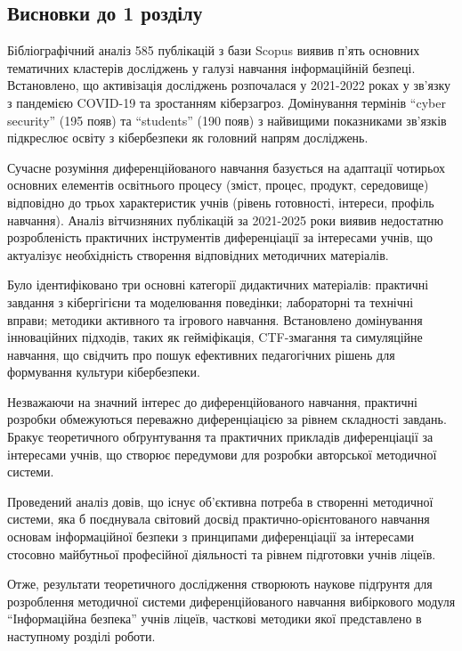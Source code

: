 \subsection*{Висновки до 1 розділу}


Бібліографічний аналіз 585 публікацій з бази Scopus виявив п'ять основних тематичних кластерів досліджень у галузі навчання інформаційній безпеці. Встановлено, що активізація досліджень розпочалася у 2021-2022 роках у зв'язку з пандемією COVID-19 та зростанням кіберзагроз. Домінування термінів ``cyber security'' (195 появ) та ``students'' (190 появ) з найвищими показниками зв'язків підкреслює освіту з кібербезпеки як головний напрям досліджень.

Сучасне розуміння диференційованого навчання базується на адаптації чотирьох основних елементів освітнього процесу (зміст, процес, продукт, середовище) відповідно до трьох характеристик учнів (рівень готовності, інтереси, профіль навчання). Аналіз вітчизняних публікацій за 2021-2025 роки виявив недостатню розробленість практичних інструментів диференціації за інтересами учнів, що актуалізує необхідність створення відповідних методичних матеріалів.

Було ідентифіковано три основні категорії дидактичних матеріалів: практичні завдання з кібергігієни та моделювання поведінки; лабораторні та технічні вправи; методики активного та ігрового навчання. Встановлено домінування інноваційних підходів, таких як гейміфікація, CTF-змагання та симуляційне навчання, що свідчить про пошук ефективних педагогічних рішень для формування культури кібербезпеки.

Незважаючи на значний інтерес до диференційованого навчання, практичні розробки обмежуються переважно диференціацією за рівнем складності завдань. Бракує теоретичного обґрунтування та практичних прикладів диференціації за інтересами учнів, що створює передумови для розробки авторської методичної системи.

Проведений аналіз довів, що існує об'єктивна потреба в створенні методичної системи, яка б поєднувала світовий досвід практично-орієнтованого навчання основам інформаційної безпеки з принципами диференціації за інтересами стосовно майбутньої професійної діяльності та рівнем підготовки учнів ліцеїв.

Отже, результати теоретичного дослідження створюють наукове підґрунтя для розроблення методичної системи диференційованого навчання вибіркового модуля ``Інформаційна безпека'' учнів ліцеїв, часткові методики якої представлено в наступному розділі роботи.

